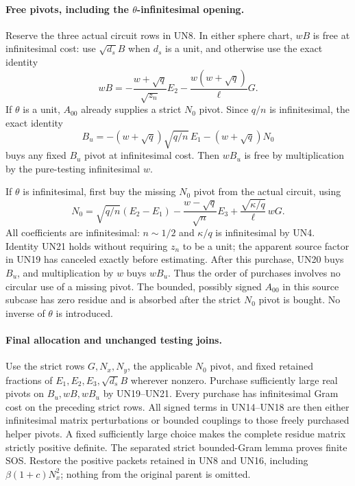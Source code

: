 \paragraph{Free pivots, including the $\theta$-infinitesimal opening.}
Reserve the three actual circuit rows in UN8. In either sphere
chart, $wB$ is free at infinitesimal cost: use $\sqrt{d_s}B$ when
$d_s$ is a unit, and otherwise use the exact identity
\[
 wB=-\frac{w+\sqrt q}{\sqrt{z_n}}E_2
                 -\frac{w(w+\sqrt q)}\ell G.
 \tag{UN19}
\]
If $\theta$ is a unit, $A_{00}$ already supplies a strict $N_0$
pivot. Since $q/n$ is infinitesimal, the exact identity
\[
 B_u=-(w+\sqrt q)\sqrt{q/n}\,E_1-(w+\sqrt q)N_0
 \tag{UN20}
\]
buys any fixed $B_u$ pivot at infinitesimal cost. Then $wB_u$ is
free by multiplication by the pure-testing infinitesimal $w$.

If $\theta$ is infinitesimal, first buy the missing $N_0$ pivot
from the actual circuit, using
\[
 N_0=\sqrt{q/n}(E_2-E_1)
       -\frac{w-\sqrt q}{\sqrt n}E_3
       +\frac{\sqrt{\kappa/q}}\ell\,wG.
 \tag{UN21}
\]
All coefficients are infinitesimal: $n\sim1/2$ and $\kappa/q$
is infinitesimal by UN4. Identity UN21 holds without requiring
$z_n$ to be a unit; the apparent source factor in UN19 has
canceled exactly before estimating. After this purchase, UN20
buys $B_u$, and multiplication by $w$ buys $wB_u$. Thus the
order of purchases involves no circular use of a missing pivot.
The bounded, possibly signed $A_{00}$ in this source subcase
has zero residue and is absorbed after the strict $N_0$ pivot is
bought. No inverse of $\theta$ is introduced.

\paragraph{Final allocation and unchanged testing joins.}
Use the strict rows $G,N_x,N_y$, the applicable $N_0$ pivot, and
fixed retained fractions of $E_1,E_2,E_3,\sqrt{d_s}B$ wherever
nonzero. Purchase sufficiently large real pivots on $B_u,wB,wB_u$
by UN19--UN21. Every purchase has infinitesimal Gram cost on
the preceding strict rows. All signed terms in UN14--UN18 are
then either infinitesimal matrix perturbations or bounded
couplings to those freely purchased helper pivots. A fixed
sufficiently large choice makes the complete residue matrix
strictly positive definite. The separated strict bounded-Gram
lemma proves finite SOS. Restore the positive packets retained
in UN8 and UN16, including $\beta(1+c)N_x^2$; nothing from the
original parent is omitted.

